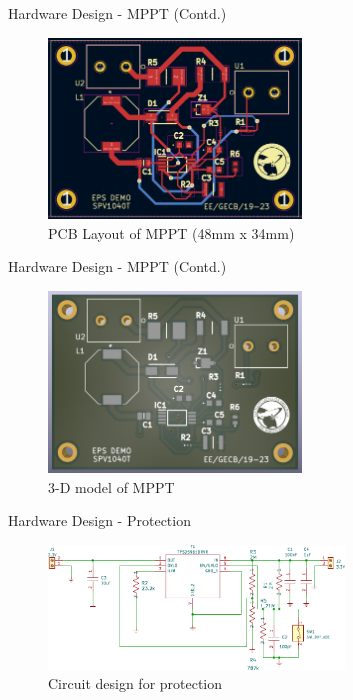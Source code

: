 \documentclass[aspectratio=169]{beamer}
\begin{document}
		\begin{frame}{Hardware Design - MPPT (Contd.) }
			\begin{figure}[h]
				\centering
				\includegraphics[width=0.6\textwidth]{diag/MpptDemopcb.png}
				\caption{PCB Layout of MPPT (48mm x 34mm)}
				\label{fig:mesh1}
			\end{figure}
		\end{frame}
		\begin{frame}{Hardware Design - MPPT (Contd.)}
			\begin{figure}[h]
				\centering
				\includegraphics[width=0.6\textwidth]{diag/MpptDemo3d.png}
				\caption{3-D model of MPPT}
				\label{fig:mesh1}
			\end{figure}
		\end{frame}
		\begin{frame}{Hardware Design - Protection }
			\begin{figure}[h]
				\centering
				\includegraphics[width=0.7\textwidth]{diag/Prot_Circ.pdf}
				\caption{Circuit design for protection}
				\label{fig:mesh1}
			\end{figure}
		\end{frame}
\end{document}
